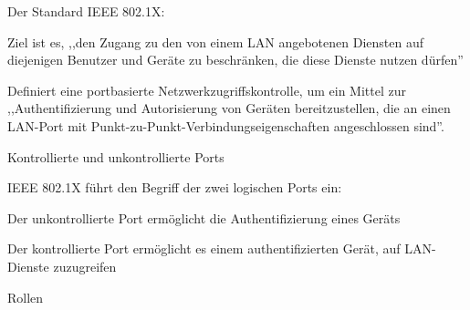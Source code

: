 \documentclass[a4paper]{article}
\begin{document}
\begin{multicols}{3}
      \begin{itemize*}
            \item Der Standard IEEE 802.1X:
            \begin{itemize*}
                  \item Ziel ist es, ,,den Zugang zu den von einem LAN angebotenen Diensten auf diejenigen Benutzer und Geräte zu beschränken, die diese Dienste nutzen dürfen''
            \end{itemize*}
            \item Definiert eine portbasierte Netzwerkzugriffskontrolle, um ein Mittel
            zur ,,Authentifizierung und Autorisierung von Geräten bereitzustellen,
            die an einen LAN-Port mit Punkt-zu-Punkt-Verbindungseigenschaften
            angeschlossen sind''.
      \end{itemize*}

      Kontrollierte und unkontrollierte Ports

      \begin{itemize*}
            \item IEEE 802.1X führt den Begriff der zwei logischen Ports ein:
            \begin{itemize*}
                  \item Der unkontrollierte Port ermöglicht die Authentifizierung eines Geräts
                  \item Der kontrollierte Port ermöglicht es einem authentifizierten Gerät, auf LAN-Dienste zuzugreifen
            \end{itemize*}
      \end{itemize*}

      Rollen


\end{multicols}
\end{document}
